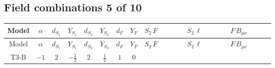 \documentclass[8pt]{article}
\begin{document}
\begin{landscape}
\subsection*{Field combinations 5 of 10}
\begin{longtable}{@{}cccccccc >{\raggedright\arraybackslash}p{0.21\linewidth} >{\raggedright\arraybackslash}p{0.21\linewidth} >{\raggedright\arraybackslash}p{0.21\linewidth}@{}}
\toprule
Model & $\alpha$ & $d_{S_1}$ & $Y_{S_1}$ & $d_{S_2}$ & $Y_{S_2}$ & $d_F$ & $Y_F$ & $S_2\,F$ & $S_2\,\ell$ & $F\,B_{\mu\nu}$ \\
\midrule
\endfirsthead
\toprule
Model & $\alpha$ & $d_{S_1}$ & $Y_{S_1}$ & $d_{S_2}$ & $Y_{S_2}$ & $d_F$ & $Y_F$ & $S_2\,F$ & $S_2\,\ell$ & $F\,B_{\mu\nu}$ \\
\midrule
\endhead
T3-B & $-1$ & $2$ & $-\frac{1}{2}$ & $2$ & $\frac{1}{2}$ & $1$ & $0$ & \scriptsize\adjustbox{max width=\linewidth}{$\begin{gathered} -C_{S_2^\dagger S_2} \hbar  \log \left(\frac{\bar{\mu}^{2}}{M_F^2}\right) \overline{y_{2,i_1,r_1}} S_{2,j_1} y_{2,i_1,r_1} S_{2,j_1}{}^{\dagger } \\ -\hbar  \log \left(\frac{\bar{\mu}^{2}}{M_F^2}\right) \overline{y_{2,i_1,r_1}} \overline{y_{2,i_2,r_2}} S_{2,j_1} S_{2,j_2} y_{2,i_1,r_2} y_{2,i_2,r_1} S_{2,j_1}{}^{\dagger } S_{2,j_2}{}^{\dagger } \\ -\hbar  \log \left(\frac{\bar{\mu}^{2}}{M_F^2}\right) \overline{y_{2,i_1,r_1}} S_{2,j_3} S_{2,j_4} y_{2,i_1,r_1} S_{2,j_1}{}^{\dagger } S_{2,j_2}{}^{\dagger } \mathcal{I}_{S_2,j_1,j_3,j_2,j_4}{}^1 \lambda_{S_2}^{(1)}\end{gathered}$} & \scriptsize\adjustbox{max width=\linewidth}{$\begin{gathered} +\frac{3 \hbar  \overline{y_{2,i_1,r_1}} \overline{y_{2,i_2,r_1}} L_{a_2,i_2}{}^T\, C\, P_L\, L_{a_1,i_1} S_{2,j_1} S_{2,j_2} {\mathcal{I}_{y_2}}^{*}_{a_1,j_1} {\mathcal{I}_{y_2}}^{*}_{a_2,j_2} g_2^2}{8 \epsilon  M_F} \\ +\frac{\hbar  \overline{y_{2,i_1,r_1}} \overline{y_{2,i_2,r_1}} L_{a_2,i_2}{}^T\, C\, P_L\, L_{a_1,i_1} S_{2,j_1} S_{2,j_2} {\mathcal{I}_{y_2}}^{*}_{a_1,j_1} {\mathcal{I}_{y_2}}^{*}_{a_2,j_2} g_2^2}{8 M_F} \\ +\frac{3 \hbar  \overline{L_{a_1,i_1}}\, C\, P_R\, \overline{L_{a_2,i_2}}{}^T y_{2,i_1,r_1} y_{2,i_2,r_1} \mathcal{I}_{y_2,a_1,j_1} \mathcal{I}_{y_2,a_2,j_2} S_{2,j_1}{}^{\dagger } S_{2,j_2}{}^{\dagger } g_2^2}{8 \epsilon  M_F}\end{gathered}$} &  \\

\end{longtable}
\end{landscape}
\end{document}
